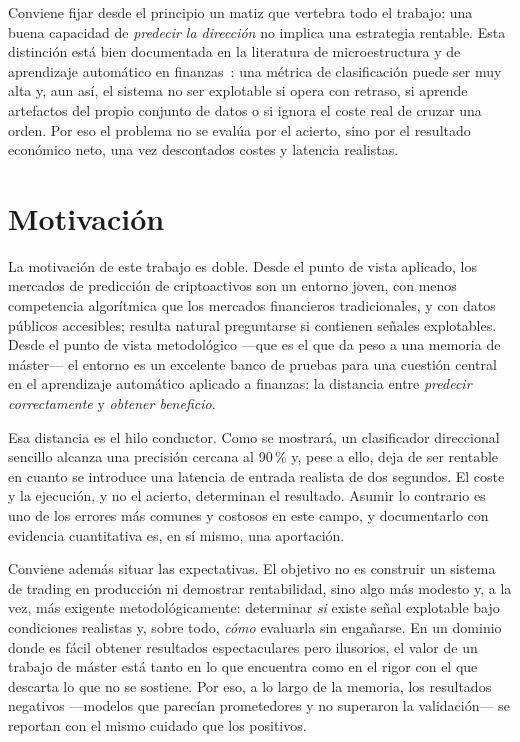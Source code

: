Conviene fijar desde el principio un matiz que vertebra todo el trabajo: una buena
capacidad de \emph{predecir la dirección} no implica una estrategia rentable. Esta
distinción está bien documentada en la literatura de microestructura y de aprendizaje
automático en finanzas~\cite{kearns2013,lopezdeprado2018,bailey2014deflated}: una métrica de
clasificación puede ser muy alta y, aun así, el sistema no ser explotable si opera con
retraso, si aprende artefactos del propio conjunto de datos o si ignora el coste real de
cruzar una orden. Por eso el problema no se evalúa por el acierto, sino por el resultado
económico neto, una vez descontados costes y latencia realistas.

\section{Motivación}

La motivación de este trabajo es doble. Desde el punto de vista aplicado, los mercados de
predicción de criptoactivos son un entorno joven, con menos competencia algorítmica que
los mercados financieros tradicionales, y con datos públicos accesibles; resulta natural
preguntarse si contienen señales explotables. Desde el punto de vista metodológico —que es
el que da peso a una memoria de máster— el entorno es un excelente banco de pruebas para
una cuestión central en el aprendizaje automático aplicado a finanzas: la distancia entre
\emph{predecir correctamente} y \emph{obtener beneficio}.

Esa distancia es el hilo conductor. Como se mostrará, un clasificador direccional sencillo
alcanza una precisión cercana al 90\,\% y, pese a ello, deja de ser rentable en cuanto se
introduce una latencia de entrada realista de dos segundos. El coste y la ejecución, y no
el acierto, determinan el resultado. Asumir lo contrario es uno de los errores más comunes
y costosos en este campo, y documentarlo con evidencia cuantitativa es, en sí mismo, una
aportación.

Conviene además situar las expectativas. El objetivo no es construir un sistema de trading en
producción ni demostrar rentabilidad, sino algo más modesto y, a la vez, más exigente
metodológicamente: determinar \emph{si} existe señal explotable bajo condiciones realistas y,
sobre todo, \emph{cómo} evaluarla sin engañarse. En un dominio donde es fácil obtener
resultados espectaculares pero ilusorios, el valor de un trabajo de máster está tanto en lo
que encuentra como en el rigor con el que descarta lo que no se sostiene. Por eso, a lo largo
de la memoria, los resultados negativos —modelos que parecían prometedores y no superaron la
validación— se reportan con el mismo cuidado que los positivos.

